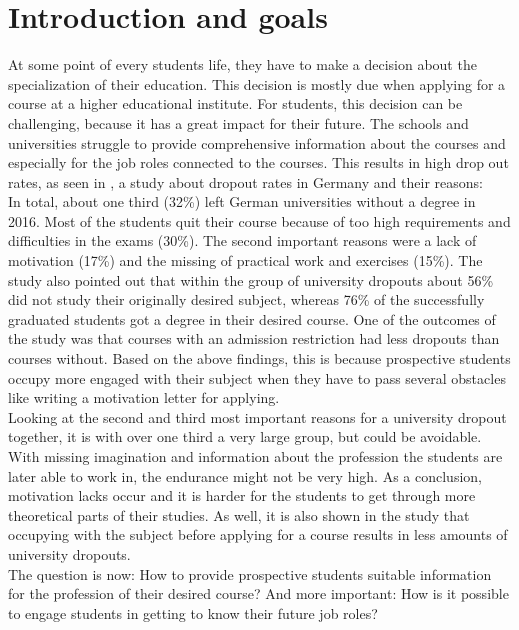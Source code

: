 \chapter{Introduction and goals}
At some point of every students life, they have to make a decision about the specialization of their education. This decision is mostly due when applying for a course at a higher educational institute. For students, this decision can be challenging, because it has a great impact for their future. The schools and universities struggle to provide comprehensive information about the courses and especially for the job roles connected to the courses. This results in high drop out rates, as seen in \cite{UlrichHeublein.Juni2017}, a study about dropout rates in Germany and their reasons: \\ In total, about one third (32\%) left German universities without a degree in 2016. Most of the students quit their course because of too high requirements and difficulties in the exams (30\%). The second important reasons were a lack of motivation (17\%) and the missing of practical work and exercises (15\%). The study also pointed out that within the group of university dropouts about 56\% did not study their originally desired subject, whereas 76\% of the successfully graduated students got a degree in their desired course. One of the outcomes of the study was that courses with an admission restriction had less dropouts than courses without. Based on the above findings, this is because prospective students occupy more engaged with their subject when they have to pass several obstacles like writing a motivation letter for applying. \\
Looking at the second and third most important reasons for a university dropout together, it is with over one third a very large group, but could be avoidable. With missing imagination and information about the profession the students are later able to work in, the endurance might not be very high. As a conclusion, motivation lacks occur and it is harder for the students to get through more theoretical parts of their studies. As well, it is also shown in the study that occupying with the subject before applying for a course results in less amounts of university dropouts. \\
The question is now: How to provide prospective students suitable information for the profession of their desired course? And more important: How is it possible to engage students in getting to know their future job roles?

